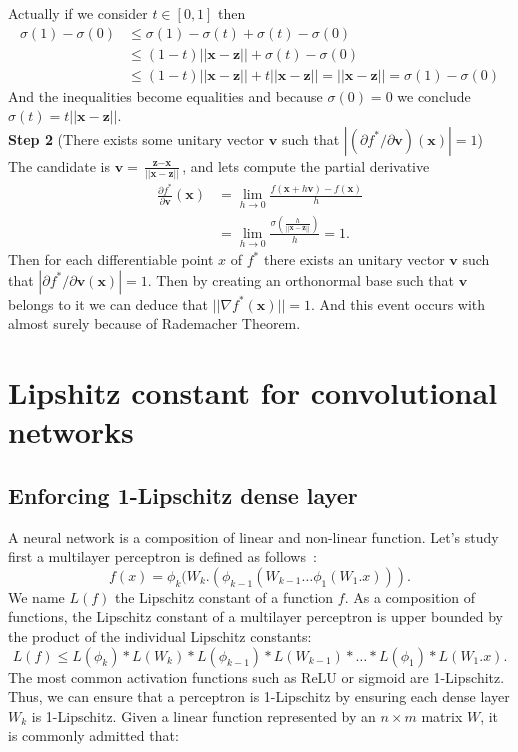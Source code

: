 Actually if we consider $t\in [0,1]$ then 
\begin{align*}
\sigma(1)-\sigma(0)&\leq \sigma(1)-\sigma(t)+\sigma(t)-\sigma(0)\\
&\leq (1-t) || \textbf{x}-\textbf{z}||+\sigma(t)-\sigma(0)
\\&\leq (1-t) || \textbf{x}-\textbf{z}||+t|| \textbf{x}-\textbf{z}||=|| \textbf{x}-\textbf{z}||=\sigma(1)-\sigma(0)
\end{align*}
And the inequalities become equalities and because $\sigma(0)=0$ we conclude $\sigma(t)=t|| \textbf{x}-\textbf{z}||$.
\\
\textbf{Step 2} (There exists some unitary vector $\textbf{v}$ such that $|(\partial f^* /\partial \textbf{v})(\textbf{x})|= 1$)\\
The candidate is $\textbf{v}=\frac{\textbf{z}-\textbf{x}}{||\textbf{x}-\textbf{z} ||}$, and lets compute the partial derivative
\begin{align*}
\frac{\partial f^* }{\partial \textbf{v}}(\textbf{x})&=\lim_{h\rightarrow 0}\frac{f(\textbf{x}+h\textbf{v})-f(\textbf{x})}{h}\\
&=\lim_{h\rightarrow 0}\frac{\sigma(\frac{h}{||\textbf{x}-\textbf{z} ||})}{h}=1.
\end{align*}
Then for each differentiable point $x$ of $f^*$ there exists an unitary vector $\textbf{v}$ such that $|\partial f^* /\partial \textbf{v}(\textbf{x})|= 1$. Then by creating an orthonormal base such that $\textbf{v}$ belongs to it we can deduce that $||\nabla f^*(\textbf{x})||=1$. And this event occurs with almost surely because of Rademacher Theorem.


\section{Lipshitz constant for convolutional networks}

\subsection{Enforcing 1-Lipschitz dense layer}
A neural network is a composition of linear and non-linear function. Let's study first a multilayer perceptron is defined as follows~:
$$f(x)=\phi_k(W_k.(\phi_{k-1}(W_{k-1}\ldots\phi_1(W_1.x))).$$
We name $L(f)$ the Lipschitz constant of a function $f$. As a composition of functions, the Lipschitz constant of a multilayer perceptron is upper bounded by the product of the individual Lipschitz constants: 
$$L(f)\leq L(\phi_k)*L(W_k)*L(\phi_{k-1})*L(W_{k-1})*\ldots*L(\phi_1)*L(W_1.x).$$
The most common activation functions such as ReLU or sigmoid are 1-Lipschitz. Thus, we can ensure that a perceptron is 1-Lipschitz by ensuring each dense layer $W_k$ is 1-Lipschitz. Given a linear function represented by an $n\times m$ matrix $W$, it is commonly admitted that:

